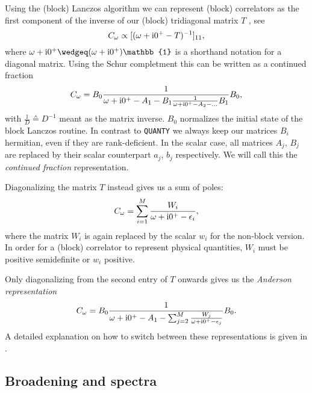 Using the (block) Lanczos algorithm we can represent (block) correlators as the first component
of the inverse of our (block) tridiagonal matrix $T$ \cite{Lu2014},
see 
\begin{equation}
    C_\omega
    \propto
    [(\omega + \mathrm{i}0^+ - T)^{-1}]_{11},
\end{equation}
where $\omega + \mi0^+ \wedgeq (\omega + \mi0^+)\mathbb{1}$ is a shorthand notation
for a diagonal matrix.
Using the Schur completment \cite{Schur1917} this can be written as a continued fraction
\begin{equation}
    C_\omega
    =
    B_0\frac{1}{\omega + \mathrm{i}0^+ - A_1 - B_1\frac{1}{\omega + \mathrm{i}0^+ - A_2 - \ldots}B_1}B_0,
\end{equation}
with $\frac{1}{D} \wedgeq D^{-1}$ meant as the matrix inverse.
$B_0$ normalizes the initial state of
the block Lanczos routine.
In contrast to \texttt{QUANTY} \cite{Ackermann2024} we always keep our matrices $B_i$ hermitian,
even if they are rank-deficient.
In the scalar case, all matrices $A_j$, $B_j$ are replaced by
their scalar counterpart $a_j$, $b_j$ respectively.
We will call this the \emph{continued fraction} representation.

Diagonalizing the matrix $T$ instead gives us a sum of poles:
\begin{equation}
    C_\omega
    =
    \sum_{i=1}^M \frac{W_i}{\omega + \mathrm{i}0^+ - \epsilon_i},
    \label{eq:correlator-sum}
\end{equation}
where the matrix $W_i$ is again replaced by the scalar $w_i$ for the non-block version.
In order for a (block) correlator to represent physical quantities,
$W_i$ must be positive semidefinite or
$w_i$ positive.

Only diagonalizing from the second entry of $T$ onwards gives us the \emph{Anderson representation}
\begin{equation}
    C_\omega
    =
    B_0\frac{1}{\omega + \mathrm{i}0^+ - A_1 - \sum_{j=2}^M \frac{W_j}{\omega + \mathrm{i}0^+ - \epsilon_j}}B_0.
    \label{eq:correlator-anderson}
\end{equation}
A detailed explanation on how to switch between these representations is given in \cite{Lu2014}.

\subsection{Broadening and spectra}

